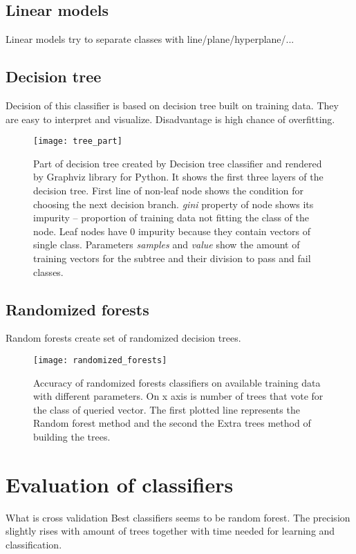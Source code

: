 \subsection{Linear models}
Linear models try to separate classes with line/plane/hyperplane/...

\subsection{Decision tree}
Decision of this classifier is based on decision tree built on training data.
They are easy to interpret and visualize. Disadvantage is high chance of
overfitting.

\begin{figure}
  \centering
  \texttt{[image: tree\_part]}
  \caption{Part of decision tree created by Decision tree classifier and
    rendered by Graphviz library for Python. It shows the first three layers of the
    decision tree. First line of non-leaf node shows the condition for choosing
    the next decision branch. \emph{gini} property of node shows its impurity --
    proportion of training data not fitting the class of the node. Leaf nodes
    have 0 impurity because they contain vectors of single class. Parameters
    \emph{samples} and \emph{value} show the amount of training vectors for the
    subtree and their division to pass and fail classes.}
  \label{fig:knn}
\end{figure}

\subsection{Randomized forests}
Random forests create set of randomized decision trees.

\begin{figure}
  \centering
  \texttt{[image: randomized\_forests]}
  \caption{Accuracy of randomized forests classifiers on available training data
    with different parameters. On x axis is number of trees that vote for the
    class of queried vector. The first plotted line represents the Random forest
    method and the second the Extra trees method of building the trees.}
  \label{fig:knn}
\end{figure}

\section{Evaluation of classifiers}
What is cross validation
Best classifiers seems to be random forest.
The precision slightly rises with amount of trees together with time needed for
learning and classification.


